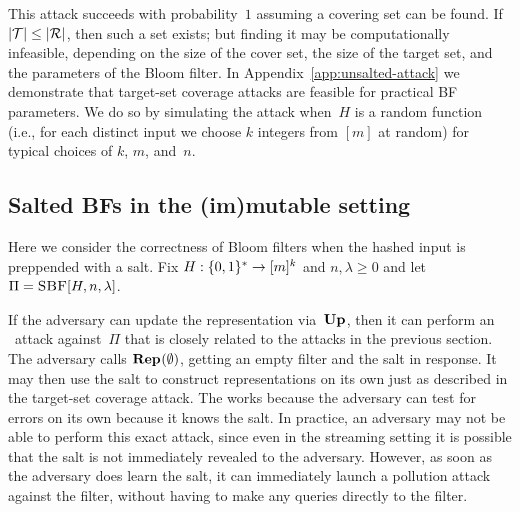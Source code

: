 This  attack succeeds with probability~$1$ assuming a covering set can
be found.  If $|\mathcal{T}| \leq |\mathcal{R}|$, then such a set exists; but finding it may be
computationally infeasible, depending on the size of the cover set, the size of
the target set, and the parameters of the Bloom filter.
%
In Appendix~\ref{app:unsalted-attack} we demonstrate that target-set coverage
attacks are feasible for practical BF parameters. We do so by simulating the
attack when~$H$ is a random function (i.e., for each distinct input we choose
$k$ integers from $[m]$ at random) for typical choices of $k$, $m$, and~$n$.


\subsection{Salted BFs in the (im)mutable setting}\label{sec:sbf}
%
Here we consider the correctness of Bloom filters when the hashed input is
preppended with a salt.
%
Fix $H:\{0,1\}^*\to[m]^k$ and $n,\lambda\geq0$ and let
$\Pi = \textnormal{\textsc{SBF}}[H,n,\lambda]$.

If the adversary can update the representation via~$\textup{\textbf{Up}}\hspace{0.5pt}$, then it can perform
an \errep\ attack against~$\Pi$ that is closely related to the attacks in the
previous section.  The adversary calls $\textup{\textbf{Rep}}\hspace{0.5pt}(\emptyset)$, getting an empty
filter and the salt in response.  It may then use the salt to construct
representations on its own just as described in the target-set coverage attack.
%
The works because the adversary can test for errors on its own because it knows
the salt.  In practice, an adversary may not be able to perform this exact
attack, since even in the streaming setting it is possible that the salt is not
immediately revealed to the adversary. However, as soon as the adversary does
learn the salt, it can immediately launch a pollution attack against the filter,
without having to make any queries directly to the filter.
%


